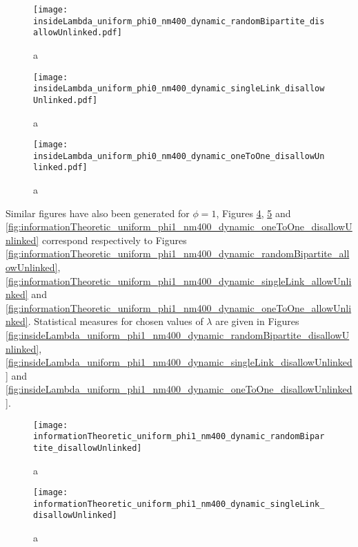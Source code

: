 \begin{figure}
  \centering
  \texttt{[image: insideLambda\_uniform\_phi0\_nm400\_dynamic\_randomBipartite\_disallowUnlinked.pdf]}
  \caption{a}
  \label{fig:insideLambda_uniform_phi0_nm400_dynamic_randomBipartite_disallowUnlinked}
\end{figure}

\begin{figure}
  \centering
  \texttt{[image: insideLambda\_uniform\_phi0\_nm400\_dynamic\_singleLink\_disallowUnlinked.pdf]}
  \caption{a}
  \label{fig:insideLambda_uniform_phi0_nm400_dynamic_singleLink_disallowUnlinked}
\end{figure}

\begin{figure}
  \centering
  \texttt{[image: insideLambda\_uniform\_phi0\_nm400\_dynamic\_oneToOne\_disallowUnlinked.pdf]}
  \caption{a}
  \label{fig:insideLambda_uniform_phi0_nm400_dynamic_oneToOne_disallowUnlinked}
\end{figure}

Similar figures have also been generated for $\phi=1$, Figures \ref{fig:informationTheoretic_uniform_phi1_nm400_dynamic_randomBipartite_disallowUnlinked},  \ref{fig:informationTheoretic_uniform_phi1_nm400_dynamic_singleLink_disallowUnlinked} and \ref{fig:informationTheoretic_uniform_phi1_nm400_dynamic_oneToOne_disallowUnlinked} correspond respectively to Figures \ref{fig:informationTheoretic_uniform_phi1_nm400_dynamic_randomBipartite_allowUnlinked},  \ref{fig:informationTheoretic_uniform_phi1_nm400_dynamic_singleLink_allowUnlinked} and \ref{fig:informationTheoretic_uniform_phi1_nm400_dynamic_oneToOne_allowUnlinked}.
Statistical measures for chosen values of $\lambda$ are given in Figures \ref{fig:insideLambda_uniform_phi1_nm400_dynamic_randomBipartite_disallowUnlinked}, \ref{fig:insideLambda_uniform_phi1_nm400_dynamic_singleLink_disallowUnlinked} and \ref{fig:insideLambda_uniform_phi1_nm400_dynamic_oneToOne_disallowUnlinked}.

\begin{figure}
  \centering
  \texttt{[image: informationTheoretic\_uniform\_phi1\_nm400\_dynamic\_randomBipartite\_disallowUnlinked]}
  \caption{a}
  \label{fig:informationTheoretic_uniform_phi1_nm400_dynamic_randomBipartite_disallowUnlinked}
\end{figure}

\begin{figure}
  \centering
  \texttt{[image: informationTheoretic\_uniform\_phi1\_nm400\_dynamic\_singleLink\_disallowUnlinked]}
  \caption{a}
  \label{fig:informationTheoretic_uniform_phi1_nm400_dynamic_singleLink_disallowUnlinked}
\end{figure}

